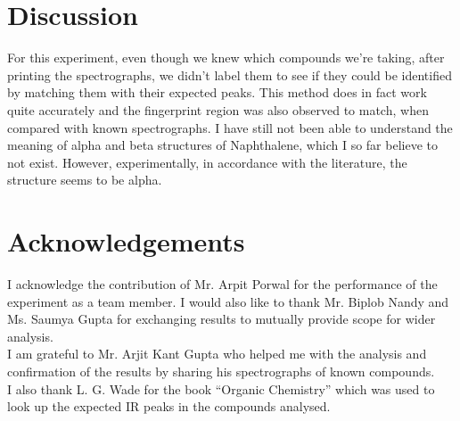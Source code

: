 \section{Discussion}
	For this experiment, even though we knew which compounds we're taking, after printing the spectrographs, we didn't label them to see if they could be identified by matching them with their expected peaks. This method does in fact work quite accurately and the fingerprint region was also observed to match, when compared with known spectrographs. I have still not been able to understand the meaning of alpha and beta structures of Naphthalene, which I so far believe to not exist. However, experimentally, in accordance with the literature, the structure seems to be alpha.\\

\section{Acknowledgements}
	I acknowledge the contribution of Mr. Arpit Porwal for the performance of the experiment as a team member. I would also like to thank Mr. Biplob Nandy and Ms. Saumya Gupta for exchanging results to mutually provide scope for wider analysis. \\
	I am grateful to Mr. Arjit Kant Gupta who helped me with the analysis and confirmation of the results by sharing his spectrographs of known compounds.\\
	I also thank L. G. Wade for the book ``Organic Chemistry'' which was used to look up the expected IR peaks in the compounds analysed.